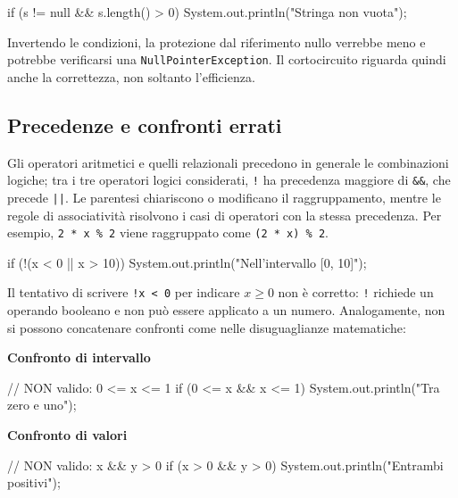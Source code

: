 \begin{unipdcode}[language=Java]
if (s != null && s.length() > 0) {
    System.out.println("Stringa non vuota");
}
\end{unipdcode}

Invertendo le condizioni, la protezione dal riferimento nullo
verrebbe meno e potrebbe verificarsi una
\texttt{NullPointerException}. Il cortocircuito riguarda quindi
anche la correttezza, non soltanto l'efficienza.

\subsection{Precedenze e confronti errati}
\label{sec:fi-java-cicli-precedenze}

Gli operatori aritmetici e quelli relazionali precedono in generale
le combinazioni logiche; tra i tre operatori logici considerati,
\texttt{!} ha precedenza maggiore di \texttt{\&\&}, che precede
\texttt{||}. Le parentesi chiariscono o modificano il
raggruppamento, mentre le regole di associatività risolvono i casi
di operatori con la stessa precedenza. Per esempio,
\texttt{2 * x \% 2} viene raggruppato come
\texttt{(2 * x) \% 2}.

\begin{unipdcode}[language=Java]
if (!(x < 0 || x > 10)) {
    System.out.println("Nell'intervallo [0, 10]");
}
\end{unipdcode}

Il tentativo di scrivere \texttt{!x < 0} per indicare \(x\ge0\)
non è corretto: \texttt{!} richiede un operando booleano e non
può essere applicato a un numero. Analogamente, non si possono
concatenare confronti come nelle disuguaglianze matematiche:

\noindent
\begin{minipage}[t]{0.48\linewidth}
\vspace{0pt}
\textbf{Confronto di intervallo}

\begin{unipdcode}[language=Java,
  basicstyle=\ttfamily\scriptsize,
  numbers=none,
  xleftmargin=1em,
  xrightmargin=1em,
  framexleftmargin=0.3em]
// NON valido: 0 <= x <= 1
if (0 <= x && x <= 1) {
    System.out.println("Tra zero e uno");
}
\end{unipdcode}
\end{minipage}%
\hfill
\begin{minipage}[t]{0.48\linewidth}
\vspace{0pt}
\textbf{Confronto di valori}

\begin{unipdcode}[language=Java,
  basicstyle=\ttfamily\scriptsize,
  numbers=none,
  xleftmargin=1em,
  xrightmargin=1em,
  framexleftmargin=0.3em]
// NON valido: x && y > 0
if (x > 0 && y > 0) {
    System.out.println("Entrambi positivi");
}
\end{unipdcode}
\end{minipage}

